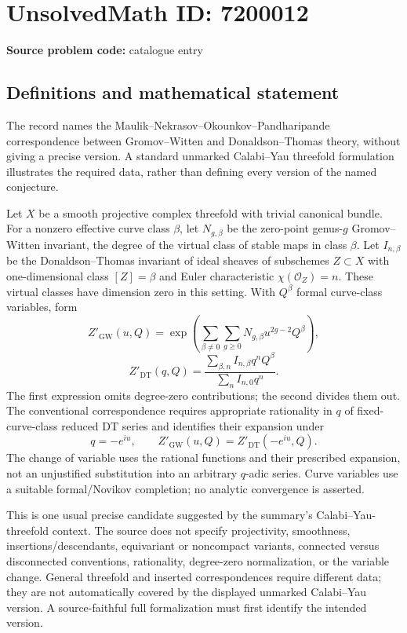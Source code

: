 \documentclass[11pt]{article}
\begin{document}
\section*{UnsolvedMath ID: 7200012}
\textbf{Source problem code:} catalogue entry
\subsection{Definitions and mathematical statement}
The record names the Maulik--Nekrasov--Okounkov--Pandharipande correspondence between Gromov--Witten and Donaldson--Thomas theory, without giving a precise version. A standard unmarked Calabi--Yau threefold formulation illustrates the required data, rather than defining every version of the named conjecture.

Let $X$ be a smooth projective complex threefold with trivial canonical bundle. For a nonzero effective curve class $\beta$, let $N_{g,\beta}$ be the zero-point genus-$g$ Gromov--Witten invariant, the degree of the virtual class of stable maps in class $\beta$. Let $I_{n,\beta}$ be the Donaldson--Thomas invariant of ideal sheaves of subschemes $Z\subset X$ with one-dimensional class $[Z]=\beta$ and Euler characteristic $\chi(\mathcal O_Z)=n$. These virtual classes have dimension zero in this setting. With $Q^\beta$ formal curve-class variables, form
\[
Z'_{\mathrm{GW}}(u,Q)=\exp\left(\sum_{\beta\ne0}\sum_{g\geq0}
N_{g,\beta}u^{2g-2}Q^\beta\right),
\]
\[
Z'_{\mathrm{DT}}(q,Q)=
\frac{\sum_{\beta,n}I_{n,\beta}q^nQ^\beta}
{\sum_n I_{n,0}q^n}.
\]
The first expression omits degree-zero contributions; the second divides them out. The conventional correspondence requires appropriate rationality in $q$ of fixed-curve-class reduced DT series and identifies their expansion under
\[
q=-e^{iu},\qquad Z'_{\mathrm{GW}}(u,Q)=Z'_{\mathrm{DT}}(-e^{iu},Q).
\]
The change of variable uses the rational functions and their prescribed expansion, not an unjustified substitution into an arbitrary $q$-adic series. Curve variables use a suitable formal/Novikov completion; no analytic convergence is asserted.

This is one usual precise candidate suggested by the summary's Calabi--Yau-threefold context. The source does not specify projectivity, smoothness, insertions/descendants, equivariant or noncompact variants, connected versus disconnected conventions, rationality, degree-zero normalization, or the variable change. General threefold and inserted correspondences require different data; they are not automatically covered by the displayed unmarked Calabi--Yau version. A source-faithful full formalization must first identify the intended version.
\end{document}
